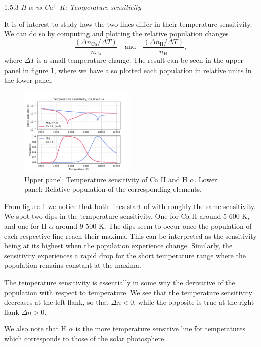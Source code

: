 \documentclass[a4paper,11.5pt,]{article}
\begin{document}
\begin{multicols}{2}
\begin{center}
1.5.3\textit{ H $\alpha$ vs Ca$^+$ K: Temperature sensitivity}
\end{center}
It is of interest to study how the two lines differ in their temperature sensitivity. We can do so by computing and plotting the relative population changes 
\[
\frac{(\Delta n_\text{Ca}/\Delta T)}{n_\text{Ca}} \quad \text{and} \quad \frac{(\Delta n_\text{H}/\Delta T)}{n_\text{H}},
\]
where $\Delta T$ is a small temperature change. The result can be seen in the upper panel in figure \ref{fig:10}, where we have also plotted each population in relative units in the lower panel.

\begin{figure}[H]
	\centering
	\includegraphics[width=0.5\textwidth]{SSA/figures/tempsens.pdf}
	\caption{Upper panel: Temperature sensitivity of Ca II and H $\alpha$. Lower panel: Relative population of the corresponding elements.}
	\label{fig:10}
\end{figure}
From figure \ref{fig:10} we notice that both lines start of with roughly the same sensitivity. We spot two dips in the temperature sensitivity. One for Ca II around 5 600 K, and one for H $\alpha$ around 9 500 K. The dips seem to occur once the population of each respective line reach their maxima. This can be interpreted as the sensitivity being at its highest when the population experience change. Similarly, the sensitivity experiences a rapid drop for the short temperature range where the population remains constant at the maxima.

The temperature sensitivity is essentially in some way the derivative of the population with respect to temperature. We see that the temperature sensitivity decreases at the left flank, so that $\Delta n < 0$, while the opposite is true at the right flank $\Delta n > 0$.

We also note that H $\alpha$ is the more temperature sensitive line for temperatures which corresponds to those of the solar photosphere.


\end{multicols}
\end{document}
